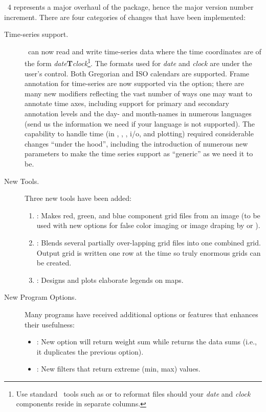 \GMT\ 4 represents a major overhaul of the package, hence the major version number increment.  There are four
categories of changes that have been implemented:
\begin{description}
\item [Time-series support.]  \GMT\ can now read and write time-series data where
the time coordinates are of the form \emph{date}\textbf{T}\emph{clock}\footnote{Use standard
\UNIX\ tools such as  or  to reformat files should
your \emph{date} and \emph{clock} components reside in separate columns.}.  The formats
used for \emph{date} and \emph{clock} are under the user's control.  Both Gregorian
and ISO calendars are supported.  Frame annotation for time-series are now supported
via the  option; there are many new modifiers reflecting the vast number of
ways one may want to annotate time axes, including support for primary and secondary
annotation levels and the day- and month-names in numerous languages (send us the information
we need if your language is not supported).  The capability to handle time (in ,
, , i/o, and plotting) required considerable changes ``under the hood'',
including the introduction of numerous new  parameters to make
the time series support as ``generic'' as we need it to be.
\item [New Tools.]  Three new tools have been added:
\begin{enumerate}
\item {}: Makes red, green, and blue component grid files from an image (to be
used with new options for false color imaging or image draping by  or ).
\item {}: Blends several partially over-lapping grid files into one combined grid.  Output
grid is written one row at the time so truly enormous grids can be created.
\item {}: Designs and plots elaborate legends on maps.
\end{enumerate}
\item [New Program Options.]  Many programs have received additional options or
features that enhances their usefulness:
\begin{itemize}
\item {}:	New option  will return weight sum while  returns
the data sums (i.e., it duplicates the previous  option).
\item {}:	New filters  that return extreme (min, max) values.

\end{itemize}
\end{description}
